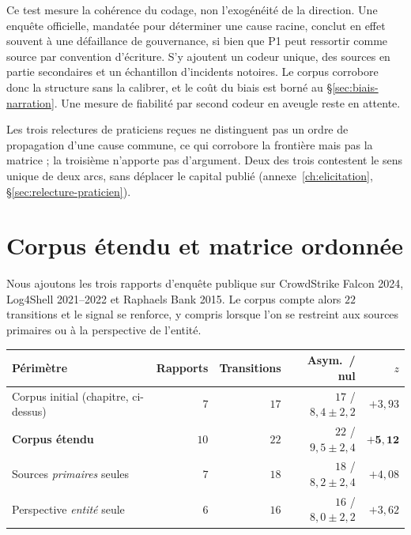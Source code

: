 Ce test mesure la cohérence du codage, non l'exogénéité de la direction. Une enquête
officielle, mandatée pour déterminer une cause racine, conclut en effet souvent à une défaillance de
gouvernance, si bien que P1 peut ressortir comme source par convention d'écriture. S'y ajoutent un
codeur unique, des sources en partie secondaires et un échantillon d'incidents notoires. Le corpus
corrobore donc la structure sans la calibrer, et le coût du biais est borné au
\S\ref{sec:biais-narration}. Une mesure de fiabilité par second codeur en aveugle reste en attente.

Les trois relectures de praticiens reçues ne distinguent pas un ordre de propagation d'une cause
commune, ce qui corrobore la frontière mais pas la matrice ; la troisième n'apporte pas d'argument. Deux
des trois contestent le sens unique de deux arcs, sans déplacer le capital publié (annexe~\ref{ch:elicitation}, \S\ref{sec:relecture-praticien}).

\section{Corpus étendu et matrice ordonnée}
\label{sec:corpus-etendu}

Nous ajoutons les trois rapports d'enquête publique sur CrowdStrike Falcon 2024, Log4Shell
2021--2022 et Raphaels Bank 2015. Le corpus compte alors $22$ transitions et le signal se renforce, y
compris lorsque l'on se restreint aux sources primaires ou à la perspective de l'entité.

\begin{center}\small
\renewcommand{\arraystretch}{1.25}
\begin{tabular}{@{}l r r r r@{}}
\toprule
\textbf{Périmètre} & \textbf{Rapports} & \textbf{Transitions} & \textbf{Asym.\ / nul} & $z$ \\
\midrule
Corpus initial (chapitre, ci-dessus) & $7$ & $17$ & $17$ / $8{,}4\pm2{,}2$ & $+3{,}93$ \\
\textbf{Corpus étendu} & $10$ & $22$ & $22$ / $9{,}5\pm2{,}4$ & $\mathbf{+5{,}12}$ \\
Sources \emph{primaires} seules & $7$ & $18$ & $18$ / $8{,}2\pm2{,}4$ & $+4{,}08$ \\
Perspective \emph{entité} seule & $6$ & $16$ & $16$ / $8{,}0\pm2{,}2$ & $+3{,}62$ \\
\bottomrule
\end{tabular}
\end{center}

